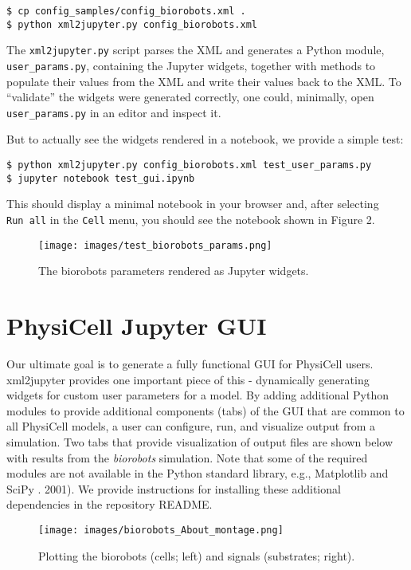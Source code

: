 \documentclass[10pt,letterpaper]{article}
\begin{document}
\begin{verbatim}
$ cp config_samples/config_biorobots.xml .
$ python xml2jupyter.py config_biorobots.xml 
\end{verbatim}

The \texttt{xml2jupyter.py} script parses the XML and generates a Python
module, \texttt{user\_params.py}, containing the Jupyter widgets,
together with methods to populate their values from the XML and write
their values back to the XML. To ``validate'' the widgets were generated
correctly, one could, minimally, open \texttt{user\_params.py} in an
editor and inspect it.

But to actually see the widgets rendered in a notebook, we provide a
simple test:

\begin{verbatim}
$ python xml2jupyter.py config_biorobots.xml test_user_params.py
$ jupyter notebook test_gui.ipynb
\end{verbatim}

This should display a minimal notebook in your browser and, after
selecting \texttt{Run\ all} in the \texttt{Cell} menu, you should see
the notebook shown in Figure 2.

\begin{figure}
\centering
\texttt{[image: images/test\_biorobots\_params.png]}
\caption{The biorobots parameters rendered as Jupyter widgets.}
\end{figure}

\section*{PhysiCell Jupyter GUI}

Our ultimate goal is to generate a fully functional GUI for PhysiCell
users. xml2jupyter provides one important piece of this - dynamically
generating widgets for custom user parameters for a model. By adding
additional Python modules to provide additional components (tabs) of the
GUI that are common to all PhysiCell models, a user can configure, run,
and visualize output from a simulation. Two tabs that provide
visualization of output files are shown below with results from the
\emph{biorobots} simulation. Note that some of the required modules are
not available in the Python standard library, e.g., Matplotlib \cite{Hunter:2007}
and SciPy \cite{Jones:2001}. 2001). We provide instructions for
installing these additional dependencies in the repository README.

\begin{figure}
\centering
\texttt{[image: images/biorobots\_About\_montage.png]}
\caption{Plotting the biorobots (cells; left) and signals (substrates;
right).}
\end{figure}
\end{document}
